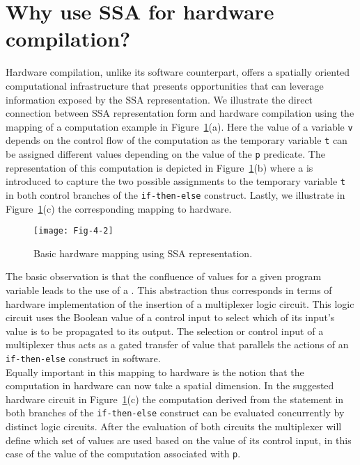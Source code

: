 \section{Why use SSA for hardware compilation?}

Hardware compilation, unlike its software counterpart, offers a spatially 
oriented computational infrastructure that presents opportunities that can 
leverage information exposed by the SSA representation. We illustrate the 
direct connection between SSA representation form and hardware compilation 
using the mapping of a computation example in Figure~\ref{fig:Fig.4.2}(a). 
Here the value of a variable {\tt v} depends on the control flow of 
the computation as the temporary variable {\tt t} can be assigned 
different values depending on the value of the {\tt p} predicate. 
The representation of this computation is depicted in 
Figure~\ref{fig:Fig.4.2}(b) where a \phifun is 
introduced to capture the two possible assignments to the temporary 
variable {\tt t} in both control branches of the {\tt if-then-else} 
construct.  Lastly, we illustrate in Figure~\ref{fig:Fig.4.2}(c) 
the corresponding mapping to hardware.\\

\begin{figure}[htbp]
\centering
\texttt{[image: Fig-4-2]}
\caption{Basic hardware mapping using SSA representation.}
\label{fig:Fig.4.2}
\end{figure}

The basic observation is that the confluence of values for a given
program variable leads to the use of a \phifun.
This \phifun abstraction thus corresponds in terms
of hardware implementation of the insertion of a multiplexer logic circuit. 
This logic circuit uses the Boolean value of a control input to select which of its 
input's value is to be propagated to its output. The selection or control input of 
a multiplexer thus acts as a gated transfer of value that parallels the actions of 
an {\tt if-then-else} construct in software.\\

Equally important in this mapping to hardware is the notion that the computation 
in hardware can now take a spatial dimension. In the suggested hardware circuit 
in Figure~\ref{fig:Fig.4.2}(c) the computation derived from the statement in both 
branches of the {\tt if-then-else} construct can be evaluated concurrently by 
distinct logic circuits. After the evaluation of both circuits the multiplexer 
will define which set of values are used based on the value of its control 
input, in this case of the value of the computation associated with {\tt p}.\\

